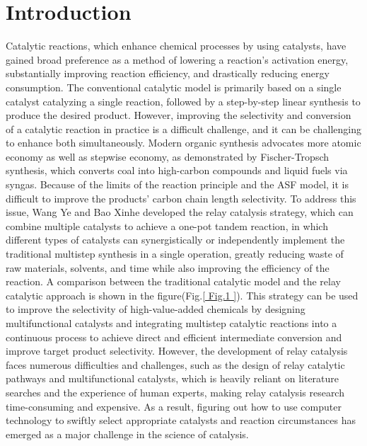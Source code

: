 \documentclass[%
 aip,
 jmp,%
 amsmath,amssymb,
 reprint,%
]{revtex4-2}
\begin{document}
\section{Introduction}
Catalytic reactions\cite{allen2012synergistic}, which enhance chemical processes by using catalysts, have gained broad preference as a method of lowering a reaction's activation energy\cite{carberry2001chemical, solymosi1991catalytic, shiozawa2008catalytic}, substantially improving reaction efficiency, and drastically reducing energy consumption. The conventional catalytic model\cite{somorjai1986structure} is primarily based on a single catalyst catalyzing a single reaction, followed by a step-by-step linear synthesis to produce the desired product. However, improving the selectivity and conversion of a catalytic reaction in practice is a difficult challenge, and it can be challenging to enhance both simultaneously. Modern organic synthesis advocates more atomic economy\cite{trost1991atom} as well as stepwise economy\cite{zhang2019one}, as demonstrated by Fischer-Tropsch synthesis\cite{anderson1984fischer}, which converts coal into high-carbon compounds and liquid fuels via syngas. Because of the limits of the reaction principle and the ASF model\cite{fortsch2015product}, it is difficult to improve the products' carbon chain length selectivity. To address this issue, Wang Ye and Bao Xinhe developed the relay catalysis strategy\cite{wu2013asymmetric, deng2016catalysis}, which can combine multiple catalysts to achieve a one-pot tandem reaction\cite{csekei2008development}, in which different types of catalysts can synergistically or independently implement the traditional multistep synthesis\cite{webb2010continuous} in a single operation, greatly reducing waste of raw materials, solvents, and time while also improving the efficiency of the reaction. A comparison between the traditional catalytic model and the relay catalytic approach\cite{wang2020recent} is shown in the figure(Fig.\ref{ Fig.1 }). This strategy can be used to improve the selectivity of high-value-added chemicals by designing multifunctional catalysts\cite{felpin2008heterogeneous} and integrating multistep catalytic reactions into a continuous process to achieve direct and efficient intermediate conversion and improve target product selectivity. However, the development of relay catalysis faces numerous difficulties and challenges\cite{martinez2021challenges}, such as the design of relay catalytic pathways and multifunctional catalysts\cite{shibasaki2006multimetallic}, which is heavily reliant on literature searches and the experience of human experts, making relay catalysis research time-consuming and expensive. As a result, figuring out how to use computer technology to swiftly select appropriate catalysts and reaction circumstances has emerged as a major challenge in the science of catalysis\cite{qiao2022transformer, tu2023predictive}.
\end{document}

